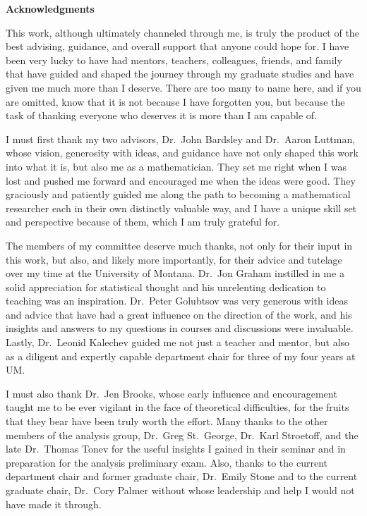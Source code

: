 
{\bf {\Large Acknowledgments}} \hfill

%

This work, although ultimately channeled through me, is truly the product of the best advising, guidance, and overall support that anyone could hope for.
I have been very lucky to have had mentors, teachers, colleagues, friends, and family that have guided and shaped the journey through my graduate studies and have given me much more than I deserve.
There are too many to name here, and if you are omitted, know that it is not because I have forgotten you, but because the task of thanking everyone who deserves it is more than I am capable of. 

I must first thank my two advisors, Dr.~John Bardsley and Dr.~Aaron Luttman, whose vision, generosity with ideas, and guidance have not only shaped this work into what it is, but also me as a mathematician.
They set me right when I was lost and pushed me forward and encouraged me when the ideas were good.
They  graciously and patiently guided me along the path to becoming a mathematical researcher each in their own distinctly valuable way, and I have a unique skill set and perspective because of them, which I am truly grateful for.

The members of my committee deserve much thanks, not only for their input in this work, but also, and likely more importantly, for their advice and tutelage over my time at the University of Montana.
Dr.~Jon Graham instilled in me a solid appreciation for statistical thought and his unrelenting dedication to teaching was an inspiration.
Dr.~Peter Golubtsov was very generous with ideas and advice that have had a great influence on the direction of the work, and his insights and answers to my questions in courses and discussions were invaluable.
Lastly, Dr.~Leonid Kalechev guided me not just a teacher and mentor, but also as a diligent and expertly capable department chair for three of my four years at UM.

I must also thank Dr.~Jen Brooks, whose early influence and encouragement taught me to be ever vigilant in the face of theoretical difficulties, for the fruits that they bear have been truly worth the effort.
Many thanks to the other members of the analysis group, Dr.~Greg St.~George, Dr.~Karl Stroetoff, and the late Dr.~Thomas Tonev for the useful insights I gained in their seminar and in preparation for the analysis preliminary exam.
Also, thanks to the current department chair and former graduate chair, Dr.~Emily Stone and to the current graduate chair, Dr.~Cory Palmer without whose leadership and help I would not have made it through.

